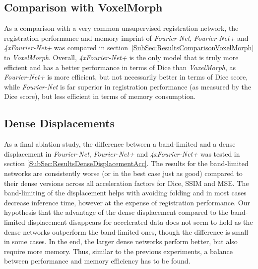 \subsection{Comparison with VoxelMorph} \label{SubSec:DiscussionComparisonVoxelMorph}
As a comparison with a very common unsupervised registration network, the registration performance and memory imprint of \emph{Fourier-Net}, \emph{Fourier-Net+} and \emph{4xFourier-Net+} was compared in section~\ref{SubSec:ResultsComparisonVoxelMorph} to \emph{VoxelMorph}. Overall, \emph{4xFourier-Net+} is the only model that is truly more efficient and has a better performance in terms of Dice than \emph{VoxelMorph}, as \emph{Fourier-Net+} is more efficient, but not necessarily better in terms of Dice score, while \emph{Fourier-Net} is far superior in registration performance (as measured by the Dice score), but less efficient in terms of memory consumption.

\subsection{Dense Displacements} \label{SubSec:DiscussionDenseDisplacements}
As a final ablation study, the difference between a band-limited and a dense displacement in \emph{Fourier-Net}, \emph{Fourier-Net+} and \emph{4xFourier-Net+} was tested in section \ref{SubSec:ResultsDenseDisplacementAcc}. The results for the band-limited networks are consistently worse (or in the best case just as good) compared to their dense versions across all acceleration factors for Dice, SSIM and MSE. The band-limiting of the displacement helps with avoiding folding and in most cases decrease inference time, however at the expense of registration performance. Our hypothesis that the advantage of the dense displacement compared to the band-limited displacement disappears for accelerated data does not seem to hold as the dense networks outperform the band-limited ones, though the difference is small in some cases. In the end, the larger dense networks perform better, but also require more memory. Thus, similar to the previous experiments, a balance between performance and memory efficiency has to be found.

